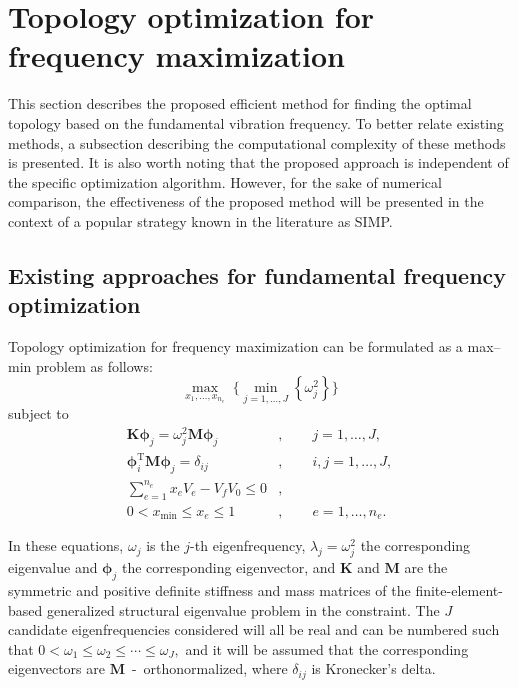 \documentclass[pdflatex,lineno,sn-mathphys-ay]{sn-jnl}
\begin{document}
\section{Topology optimization for frequency maximization}

This section describes the proposed efficient method for finding the optimal topology based on the fundamental vibration frequency. To better relate existing methods, a subsection describing the computational complexity of these methods is presented. It is also worth noting that the proposed approach is independent of the specific optimization algorithm. However, for the sake of numerical comparison, the effectiveness of the proposed method will be presented in the context of a popular strategy known in the literature as SIMP.

\subsection{Existing approaches for fundamental frequency optimization}
Topology optimization for frequency maximization can be formulated as a max--min problem as follows:
\begin{equation} \label{eqn:minmax}
\max_{x_1,\ldots,x_{n_e}} \; \Bigg\{ \min_{j=1,\ldots,J} \left\{ \omega_j^2 \right\} \Bigg\}
\end{equation}
subject to
\begin{align*}
\mathbf{K}\boldsymbol{\phi}_j = \omega_j^2 \mathbf{M}\boldsymbol{\phi}_j &, \qquad j = 1,\ldots,J, \\[4pt]
\boldsymbol{\phi}_i^{\mathrm T} \mathbf{M} \boldsymbol{\phi}_j = \delta_{ij} &, \qquad i,j = 1,\ldots,J, \\[4pt]
\sum_{e=1}^{n_e} x_e V_e - V_f V_0 \le 0 &, \\[4pt]
0 < x_{\min} \le x_e \le 1 &, \qquad e = 1,\ldots,n_e.
\end{align*}
 
In these equations, $\omega_j$ is the $j$-th eigenfrequency, $\lambda_j = \omega_j^2$ the corresponding eigenvalue and $\boldsymbol{\phi}_j$ the corresponding eigenvector, and 
$\mathbf{K}$ and $\mathbf{M}$ are the symmetric and positive definite stiffness and mass matrices of the finite-element-based generalized structural eigenvalue problem in the constraint. The $J$ candidate eigenfrequencies considered will all be real and can be numbered such that $0 < \omega_1 \le \omega_2 \le \cdots \le \omega_J,$ and it will be assumed that the corresponding eigenvectors are $\mathbf{M}$~-~orthonormalized, where $\delta_{ij}$ is 
Kronecker’s delta.
 
\end{document}

